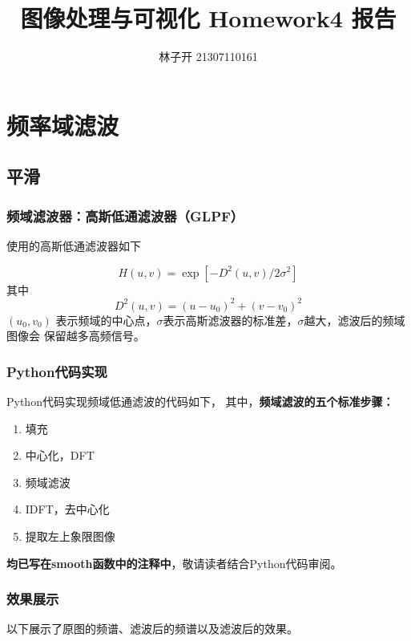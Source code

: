 \documentclass{article}
\title{图像处理与可视化 Homework4 报告}
\author{林子开 21307110161}
\begin{document}
	\maketitle
	\tableofcontents

\section{频率域滤波}

\subsection{平滑}

\subsubsection{频域滤波器：高斯低通滤波器（GLPF）}
使用的高斯低通滤波器如下

\[
H(u,v) = \exp[-D^2(u,v)/2\sigma^2]	
\]
其中
\[
D^2(u,v) = (u-u_0)^2 + (v-v_0)^2	
\]
$(u_0,v_0)$ 表示频域的中心点，$\sigma$表示高斯滤波器的标准差，$\sigma$越大，滤波后的频域图像会
保留越多高频信号。

\subsubsection{Python代码实现}
Python代码实现频域低通滤波的代码如下，
其中，\textbf{频域滤波的五个标准步骤：}
\begin{enumerate}
	\item 填充
	\item 中心化，DFT
	\item 频域滤波
	\item IDFT，去中心化
	\item 提取左上象限图像
\end{enumerate}
\textbf{均已写在smooth函数中的注释中}，敬请读者结合Python代码审阅。



\subsubsection{效果展示}

以下展示了原图的频谱、滤波后的频谱以及滤波后的效果。
\end{document}
